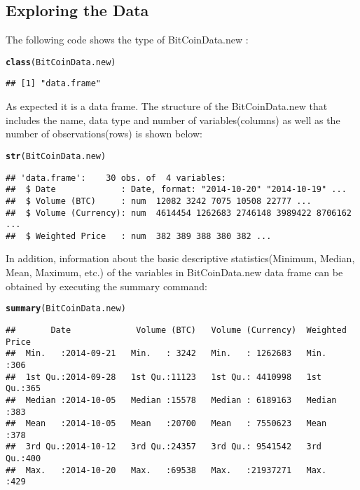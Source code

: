 \documentclass{article}\usepackage[]{graphicx}\usepackage[]{color}
\makeatletter
\newcommand{\hlstd}[1]{\textcolor[rgb]{0.345,0.345,0.345}{#1}}%
\newcommand{\hlkwd}[1]{\textcolor[rgb]{0.737,0.353,0.396}{\textbf{#1}}}%
\newenvironment{kframe}{%
 \def\at@end@of@kframe{}%
 \ifinner\ifhmode%
  \def\at@end@of@kframe{\end{minipage}}%
  \begin{minipage}{\columnwidth}%
 \fi\fi%
 \def\FrameCommand##1{\hskip\@totalleftmargin \hskip-\fboxsep
 \colorbox{shadecolor}{##1}\hskip-\fboxsep
     \hskip-\linewidth \hskip-\@totalleftmargin \hskip\columnwidth}%
 \MakeFramed {\advance\hsize-\width
   \@totalleftmargin\z@ \linewidth\hsize
   \@setminipage}}%
 {\par\unskip\endMakeFramed%
 \at@end@of@kframe}
\newenvironment{knitrout}{}{} %
\makeatother
\begin{document}
\subsection{Exploring the Data}
The following code shows the type of BitCoinData.new : 
\begin{knitrout}
\color{fgcolor}\begin{kframe}
\begin{alltt}
\hlkwd{class}\hlstd{(BitCoinData.new)}
\end{alltt}
\begin{verbatim}
## [1] "data.frame"
\end{verbatim}
\end{kframe}
\end{knitrout}
As expected it is a data frame. The structure of the BitCoinData.new that
includes the name, data type and number of variables(columns) as well as the number of observations(rows) is shown below:
\begin{knitrout}
\color{fgcolor}\begin{kframe}
\begin{alltt}
\hlkwd{str}\hlstd{(BitCoinData.new)}
\end{alltt}
\begin{verbatim}
## 'data.frame':	30 obs. of  4 variables:
##  $ Date             : Date, format: "2014-10-20" "2014-10-19" ...
##  $ Volume (BTC)     : num  12082 3242 7075 10508 22777 ...
##  $ Volume (Currency): num  4614454 1262683 2746148 3989422 8706162 ...
##  $ Weighted Price   : num  382 389 388 380 382 ...
\end{verbatim}
\end{kframe}
\end{knitrout}
In addition, information about the basic descriptive statistics(Minimum, Median, Mean, Maximum, etc.) of the variables in BitCoinData.new data frame can be obtained by executing the summary command:
\begin{knitrout}
\color{fgcolor}\begin{kframe}
\begin{alltt}
\hlkwd{summary}\hlstd{(BitCoinData.new)}
\end{alltt}
\begin{verbatim}
##       Date             Volume (BTC)   Volume (Currency)  Weighted Price
##  Min.   :2014-09-21   Min.   : 3242   Min.   : 1262683   Min.   :306   
##  1st Qu.:2014-09-28   1st Qu.:11123   1st Qu.: 4410998   1st Qu.:365   
##  Median :2014-10-05   Median :15578   Median : 6189163   Median :383   
##  Mean   :2014-10-05   Mean   :20700   Mean   : 7550623   Mean   :378   
##  3rd Qu.:2014-10-12   3rd Qu.:24357   3rd Qu.: 9541542   3rd Qu.:400   
##  Max.   :2014-10-20   Max.   :69538   Max.   :21937271   Max.   :429
\end{verbatim}
\end{kframe}
\end{knitrout}
\end{document}
